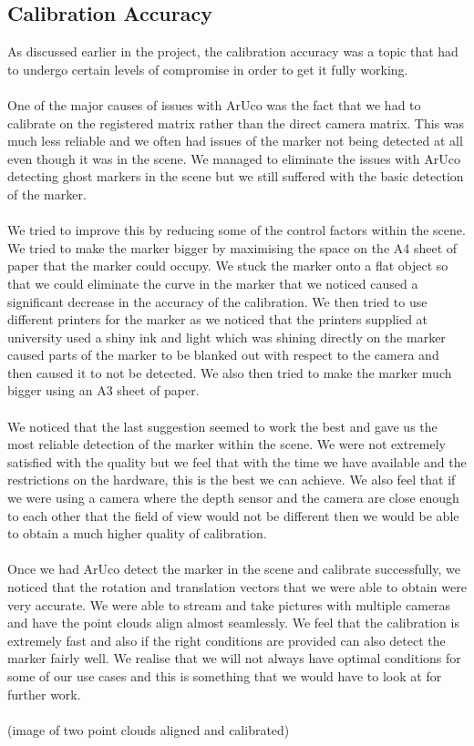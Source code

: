 \documentclass{article}
\begin{document}
\subsection{Calibration Accuracy}
As discussed earlier in the project, the calibration accuracy was a topic that had to undergo certain levels of compromise in order to get it fully working.
\\\\
One of the major causes of issues with ArUco was the fact that we had to calibrate on the registered matrix rather than the direct camera matrix. This was much less reliable and we often had issues of the marker not being detected at all even though it was in the scene. We managed to eliminate the issues with ArUco detecting ghost markers in the scene but we still suffered with the basic detection of the marker.
\\\\
We tried to improve this by reducing some of the control factors within the scene. We tried to make the marker bigger by maximising the space on the A4 sheet of paper that the marker could occupy. We stuck the marker onto a flat object so that we could eliminate the curve in the marker that we noticed caused a significant decrease in the accuracy of the calibration. We then tried to use different printers for the marker as we noticed that the printers supplied at university used a shiny ink and light which was shining directly on the marker caused parts of the marker to be blanked out with respect to the camera and then caused it to not be detected. We also then tried to make the marker much bigger using an A3 sheet of paper.
\\\\
We noticed that the last suggestion seemed to work the best and gave us the most reliable detection of the marker within the scene. We were not extremely satisfied with the quality but we feel that with the time we have available and the restrictions on the hardware, this is the best we can achieve. We also feel that if we were using a camera where the depth sensor and the camera are close enough to each other that the field of view would not be different then we would be able to obtain a much higher quality of calibration.
\\\\
Once we had ArUco detect the marker in the scene and calibrate successfully, we noticed that the rotation and translation vectors that we were able to obtain were very accurate. We were able to stream and take pictures with multiple cameras and have the point clouds align almost seamlessly. We feel that the calibration is extremely fast and also if the right conditions are provided can also detect the marker fairly well. We realise that we will not always have optimal conditions for some of our use cases and this is something that we would have to look at for further work.
\\\\
(image of two point clouds aligned and calibrated)
\end{document}
